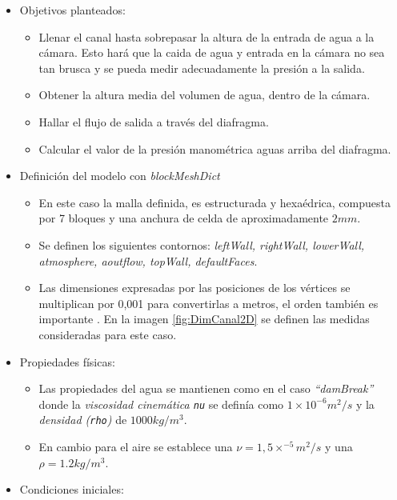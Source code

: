 \begin{itemize}
\item
  Objetivos planteados:

  \begin{itemize}
  \item
    Llenar el canal hasta sobrepasar la altura de la entrada de agua a
    la cámara. Esto hará que la caida de agua y entrada en la cámara no
    sea tan brusca y se pueda medir adecuadamente la presión a la
    salida.
  \item
    Obtener la altura media del volumen de agua, dentro de la cámara.
  \item
    Hallar el flujo de salida a través del diafragma.
  \item
    Calcular el valor de la presión manométrica aguas arriba del
    diafragma.
  \end{itemize}
\item
  Definición del modelo con \emph{blockMeshDict}

  \begin{itemize}
  \item
    En este caso la malla definida, es estructurada y hexaédrica,
    compuesta por 7 bloques y una anchura de celda de aproximadamente
    \(2 mm\).
  \item
    Se definen los siguientes contornos: \emph{leftWall, rightWall,
    lowerWall, atmosphere, aoutflow, topWall, defaultFaces}.
  \item
    Las dimensiones expresadas por las posiciones de los vértices se
    multiplican por 0,001 para convertirlas a metros, el orden también
    es importante \cite{guideblockMesh}. En la imagen \autoref{fig:DimCanal2D} se definen las
    medidas consideradas para este caso.

  \end{itemize}
\item
  Propiedades físicas:

  \begin{itemize}
  \item
    Las propiedades del agua se mantienen como en el caso
    \emph{``damBreak''} donde la \emph{viscosidad cinemática \texttt{nu}}
    se definía como \(1\times10^{-6} m^2/s\) y la \emph{densidad
    (\texttt{rho})} de \(1000 kg/m^3\).
  \item
    En cambio para el aire se establece una
    \(\nu=1,5 \times ^{-5} m^2/s\) y una \(\rho=1.2kg/m^3\).
  \end{itemize}
\item
  Condiciones iniciales:


\end{itemize}

